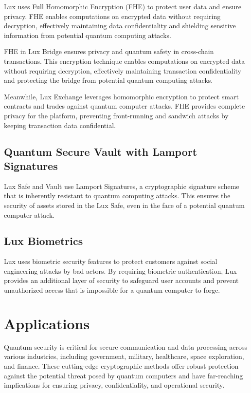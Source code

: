 \documentclass[11pt]{article}
\begin{document}
Lux uses Full Homomorphic Encryption (FHE) to protect user data and ensure privacy. FHE enables computations on encrypted data without requiring decryption, effectively maintaining data confidentiality and shielding sensitive information from potential quantum computing attacks.


FHE in Lux Bridge ensures privacy and quantum safety in cross-chain transactions. This encryption technique enables computations on encrypted data without requiring decryption, effectively maintaining transaction confidentiality and protecting the bridge from potential quantum computing attacks.


Meanwhile, Lux Exchange leverages homomorphic encryption to protect smart contracts and trades against quantum computer attacks. FHE provides complete privacy for the platform, preventing front-running and sandwich attacks by keeping transaction data confidential.


\subsection{Quantum Secure Vault with Lamport Signatures}

Lux Safe and Vault use Lamport Signatures, a cryptographic signature scheme that is inherently resistant to quantum computing attacks. This ensures the security of assets stored in the Lux Safe, even in the face of a potential quantum computer attack.


\subsection{Lux Biometrics}

Lux uses biometric security features to protect customers against social engineering attacks by bad actors. By requiring biometric authentication, Lux provides an additional layer of security to safeguard user accounts and prevent unauthorized access that is impossible for a quantum computer to forge.


\section{Applications}

Quantum security is critical for secure communication and data processing across various industries, including government, military, healthcare, space exploration, and finance. These cutting-edge cryptographic methods offer robust protection against the potential threat posed by quantum computers and have far-reaching implications for ensuring privacy, confidentiality, and operational security.
\end{document}
